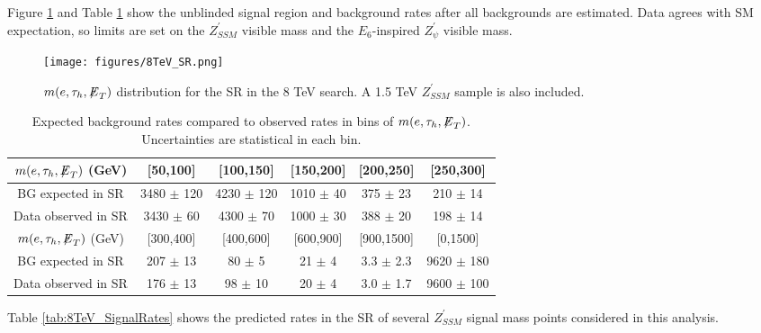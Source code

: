 Figure \ref{fig:8TeV_SR} and Table \ref{tab:8TeV_BGRates} show the unblinded signal region and background rates after all backgrounds are estimated. Data agrees with SM expectation, so limits are set on the $Z^{\prime}_{SSM}$ visible mass and the $E_6$-inspired $Z^{\prime}_{\psi}$ visible mass.

\begin{figure}[tbh!]
\centering
\texttt{[image: figures/8TeV\_SR.png]}
\caption{$m(e,\tau_{h},{\not\mathrel{E}}_T)$ distribution for the SR in the 8 TeV search. A 1.5 TeV $Z^{\prime}_{SSM}$ sample is also included.}
\label{fig:8TeV_SR}
\end{figure}

\begin{table}[ht]
\begin{center}
  \caption{Expected background rates compared to observed rates in bins of $m(e,\tau_{h},{\not\mathrel{E}}_T)$. Uncertainties are statistical in each bin.}\label{tab:8TeV_BGRates}
  \begin{tabular}{| c | c | c | c | c | c |}
  \hline
       $m(e,\tau_{h},{\not\mathrel{E}}_T)$ (GeV)      & [50,100]    & [100,150]     & [150,200]      & [200,250]     & [250,300]       \\ \hline
   BG expected in SR  & 3480 $\pm$ 120  & 4230 $\pm$ 120  & 1010 $\pm$ 40  & 375 $\pm$ 23 & 210 $\pm$ 14 \\
   Data observed in SR & 3430 $\pm$ 60  & 4300 $\pm$ 70   & 1000 $\pm$ 30  & 388 $\pm$ 20 & 198 $\pm$ 14  \\   \hline
       $m(e,\tau_{h},{\not\mathrel{E}}_T)$ (GeV) & [300,400]  & [400,600]   & [600,900]  & [900,1500] & [0,1500]      \\ \hline  
       BG expected in SR    & 207 $\pm$ 13   & 80 $\pm$ 5  & 21 $\pm$ 4  & 3.3 $\pm$ 2.3 & 9620 $\pm$ 180        \\   
       Data observed in SR  & 176 $\pm$ 13  & 98 $\pm$ 10  & 20 $\pm$ 4  & 3.0 $\pm$ 1.7 & 9600 $\pm$ 100      \\   

  \hline
  \end{tabular}
\end{center}
\end{table}

Table \ref{tab:8TeV_SignalRates} shows the predicted rates in the SR of several $Z^{\prime}_{SSM}$ signal mass points considered in this analysis.


